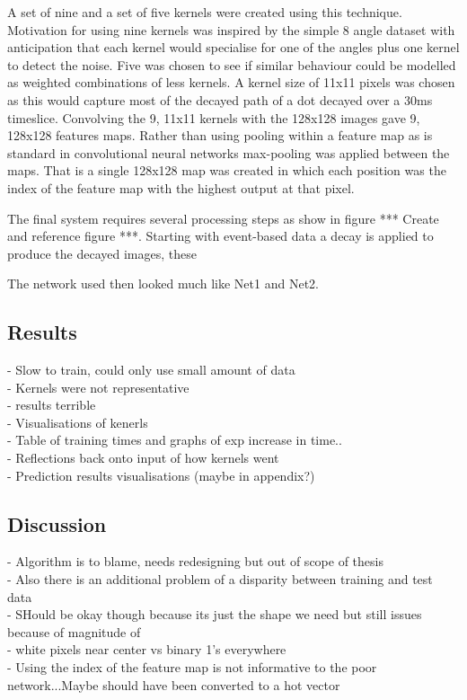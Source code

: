 A set of nine and a set of five kernels were created using this technique.
Motivation for using nine kernels was inspired by the simple 8 angle dataset with anticipation that each kernel would specialise for one of the angles plus one kernel to detect the noise.
Five was chosen to see if similar behaviour could be modelled as weighted combinations of less kernels.
A kernel size of 11x11 pixels was chosen as this would capture most of the decayed path of a dot decayed over a 30ms timeslice.
Convolving the 9, 11x11 kernels with the 128x128 images gave 9, 128x128 features maps.
Rather than using pooling within a feature map as is standard in convolutional neural networks max-pooling was applied between the maps. 
That is a single 128x128 map was created in which each position was the index of the feature map with the highest output at that pixel.

The final system requires several processing steps as show in figure *** Create and reference figure ***. 
Starting with event-based data a decay is applied to produce the decayed images, these 


The network used then looked much like Net1 and Net2.

\subsection{Results}
 - Slow to train, could only use small amount of data \\
 - Kernels were not representative  \\
 - results terrible \\
 - Visualisations of kenerls \\
 - Table of training times and graphs of exp increase in time.. \\
 - Reflections back onto input of how kernels went \\
 - Prediction results visualisations (maybe in appendix?) \\

\subsection{Discussion}
 - Algorithm is to blame, needs redesigning but out of scope of thesis
\\ - Also there is an additional problem of a disparity between training and test data
\\ - SHould be okay though because its just the shape we need but still issues because of magnitude of
\\ - white pixels near center vs binary 1's everywhere
\\ - Using the index of the feature map is not informative to the poor network...Maybe should have been converted to a hot vector


